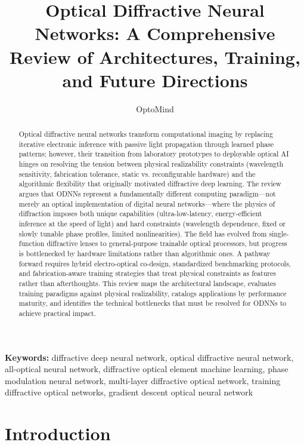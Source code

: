 \documentclass[11pt]{article}
\title{Optical Diffractive Neural Networks: A Comprehensive Review of Architectures, Training, and Future Directions}
\author{OptoMind}
\date{}
\begin{document}
\maketitle

\begin{abstract}
Optical diffractive neural networks transform computational imaging by replacing iterative electronic inference with passive light propagation through learned phase patterns; however, their transition from laboratory prototypes to deployable optical AI hinges on resolving the tension between physical realizability constraints (wavelength sensitivity, fabrication tolerance, static vs. reconfigurable hardware) and the algorithmic flexibility that originally motivated diffractive deep learning. The review argues that ODNNs represent a fundamentally different computing paradigm---not merely an optical implementation of digital neural networks---where the physics of diffraction imposes both unique capabilities (ultra-low-latency, energy-efficient inference at the speed of light) and hard constraints (wavelength dependence, fixed or slowly tunable phase profiles, limited nonlinearities). The field has evolved from single-function diffractive lenses to general-purpose trainable optical processors, but progress is bottlenecked by hardware limitations rather than algorithmic ones. A pathway forward requires hybrid electro-optical co-design, standardized benchmarking protocols, and fabrication-aware training strategies that treat physical constraints as features rather than afterthoughts. This review maps the architectural landscape, evaluates training paradigms against physical realizability, catalogs applications by performance maturity, and identifies the technical bottlenecks that must be resolved for ODNNs to achieve practical impact.
\end{abstract}

\noindent\textbf{Keywords:} diffractive deep neural network, optical diffractive neural network, all-optical neural network, diffractive optical element machine learning, phase modulation neural network, multi-layer diffractive optical network, training diffractive optical networks, gradient descent optical neural network

\section{Introduction}\label{introduction}
\end{document}
